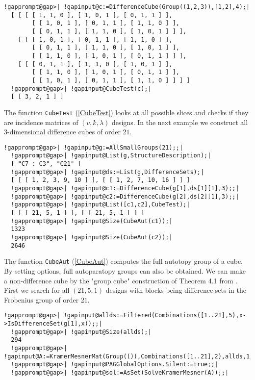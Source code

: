 \documentclass[a4paper,11pt]{report}
\begin{document}
{{\begin{Verbatim}[commandchars=!@|,fontsize=\small,frame=single,label=Example]
  !gapprompt@gap>| !gapinput@c:=DifferenceCube(Group((1,2,3)),[1,2],4);|
  [ [ [ [ 1, 1, 0 ], [ 1, 0, 1 ], [ 0, 1, 1 ] ], 
        [ [ 1, 0, 1 ], [ 0, 1, 1 ], [ 1, 1, 0 ] ], 
        [ [ 0, 1, 1 ], [ 1, 1, 0 ], [ 1, 0, 1 ] ] ], 
    [ [ [ 1, 0, 1 ], [ 0, 1, 1 ], [ 1, 1, 0 ] ], 
        [ [ 0, 1, 1 ], [ 1, 1, 0 ], [ 1, 0, 1 ] ], 
        [ [ 1, 1, 0 ], [ 1, 0, 1 ], [ 0, 1, 1 ] ] ], 
    [ [ [ 0, 1, 1 ], [ 1, 1, 0 ], [ 1, 0, 1 ] ], 
        [ [ 1, 1, 0 ], [ 1, 0, 1 ], [ 0, 1, 1 ] ], 
        [ [ 1, 0, 1 ], [ 0, 1, 1 ], [ 1, 1, 0 ] ] ] ]
  !gapprompt@gap>| !gapinput@CubeTest(c);|
  [ [ 3, 2, 1 ] ]
\end{Verbatim}
 The function \texttt{CubeTest} (\ref{CubeTest}) looks at all possible slices and checks if they are incidence matrices of $(v,k,\lambda)$ designs. In the next example we construct all $3$-dimensional difference cubes of order $21$. 
\begin{Verbatim}[commandchars=!@|,fontsize=\small,frame=single,label=Example]
  !gapprompt@gap>| !gapinput@g:=AllSmallGroups(21);;|
  !gapprompt@gap>| !gapinput@List(g,StructureDescription);|
  [ "C7 : C3", "C21" ]
  !gapprompt@gap>| !gapinput@ds:=List(g,DifferenceSets);|
  [ [ [ 1, 2, 3, 9, 10 ] ], [ [ 1, 2, 7, 10, 16 ] ] ]
  !gapprompt@gap>| !gapinput@c1:=DifferenceCube(g[1],ds[1][1],3);;|
  !gapprompt@gap>| !gapinput@c2:=DifferenceCube(g[2],ds[2][1],3);;|
  !gapprompt@gap>| !gapinput@List([c1,c2],CubeTest);|
  [ [ [ 21, 5, 1 ] ], [ [ 21, 5, 1 ] ] ]
  !gapprompt@gap>| !gapinput@Size(CubeAut(c1));|
  1323
  !gapprompt@gap>| !gapinput@Size(CubeAut(c2));|
  2646
\end{Verbatim}
 The function \texttt{CubeAut} (\ref{CubeAut}) computes the full autotopy group of a cube. By setting options, full
autoparatopy groups can also be obtained. We can make a non-difference cube by
the "group cube" construction of Theorem 4.1 from \cite{KPT23}. First we search for all $(21,5,1)$ designs with blocks being difference sets in the Frobenius group of order $21$. 
\begin{Verbatim}[commandchars=!@|,fontsize=\small,frame=single,label=Example]
  !gapprompt@gap>| !gapinput@allds:=Filtered(Combinations([1..21],5),x->IsDifferenceSet(g[1],x));;|
  !gapprompt@gap>| !gapinput@Size(allds);|
  294
  !gapprompt@gap>| !gapinput@A:=KramerMesnerMat(Group(()),Combinations([1..21],2),allds,1,21);;|
  !gapprompt@gap>| !gapinput@PAGGlobalOptions.Silent:=true;;|
  !gapprompt@gap>| !gapinput@sol:=AsSet(SolveKramerMesner(A));;|

\end{Verbatim}}}
\end{document}
